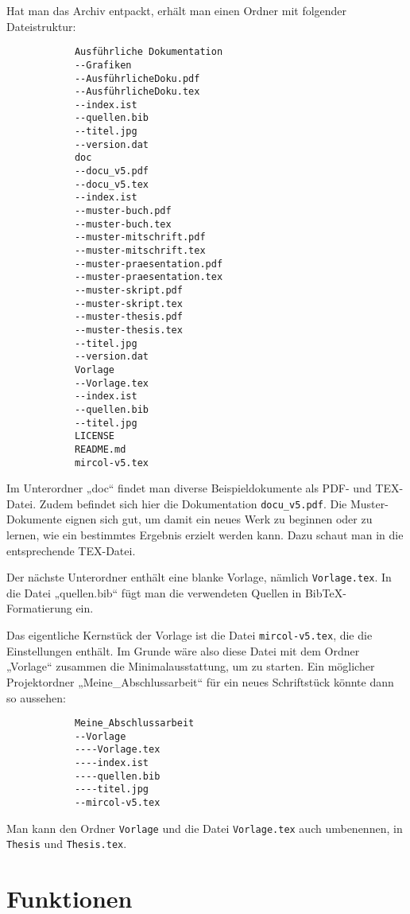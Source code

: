 			Hat man das Archiv entpackt, erhält man einen Ordner mit folgender Dateistruktur: 
			
			\begin{verbatim}
			Ausführliche Dokumentation
			--Grafiken
			--AusführlicheDoku.pdf
			--AusführlicheDoku.tex
			--index.ist
			--quellen.bib
			--titel.jpg
			--version.dat
			doc
			--docu_v5.pdf
			--docu_v5.tex
			--index.ist
			--muster-buch.pdf
			--muster-buch.tex
			--muster-mitschrift.pdf
			--muster-mitschrift.tex
			--muster-praesentation.pdf
			--muster-praesentation.tex
			--muster-skript.pdf
			--muster-skript.tex
			--muster-thesis.pdf
			--muster-thesis.tex
			--titel.jpg
			--version.dat
			Vorlage
			--Vorlage.tex
			--index.ist
			--quellen.bib
			--titel.jpg
			LICENSE
			README.md
			mircol-v5.tex
			\end{verbatim}
			
			Im Unterordner „doc“ findet man diverse Beispieldokumente als PDF- und TEX-Datei. Zudem befindet sich hier die Dokumentation \texttt{docu\_v5.pdf}. Die Muster-Dokumente eignen sich gut, um damit ein neues Werk zu beginnen oder zu lernen, wie ein bestimmtes Ergebnis erzielt werden kann. Dazu schaut man in die entsprechende TEX-Datei. 
			
			Der nächste Unterordner enthält eine blanke Vorlage, nämlich \texttt{Vorlage.tex}. In die Datei „quellen.bib“ fügt man die verwendeten Quellen in BibTeX-Formatierung ein. 
			
			Das eigentliche Kernstück der Vorlage ist die Datei \texttt{mircol-v5.tex}, die die Einstellungen enthält. Im Grunde wäre also diese Datei mit dem Ordner „Vorlage“ zusammen die Minimalausstattung, um zu starten. Ein möglicher Projektordner „Meine\_Abschlussarbeit“ für ein neues Schriftstück könnte dann so aussehen: 
			
		
			
			\begin{verbatim}
			Meine_Abschlussarbeit
			--Vorlage
			----Vorlage.tex
			----index.ist
			----quellen.bib
			----titel.jpg
			--mircol-v5.tex
			\end{verbatim}
			
			Man kann den Ordner \texttt{Vorlage} und die Datei \texttt{Vorlage.tex} auch umbenennen, \zb in \texttt{Thesis} und \texttt{Thesis.tex}. 

	\chapter{Funktionen}
		
